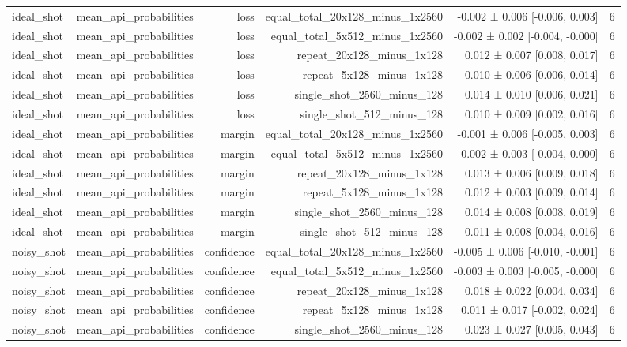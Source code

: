 \begin{table}
\begin{tabular}{lrrrrr}
ideal\_shot & mean\_api\_probabilities & loss & equal\_total\_20x128\_minus\_1x2560 & -0.002 ± 0.006 [-0.006, 0.003] & 6 \\
ideal\_shot & mean\_api\_probabilities & loss & equal\_total\_5x512\_minus\_1x2560 & -0.002 ± 0.002 [-0.004, -0.000] & 6 \\
ideal\_shot & mean\_api\_probabilities & loss & repeat\_20x128\_minus\_1x128 & 0.012 ± 0.007 [0.008, 0.017] & 6 \\
ideal\_shot & mean\_api\_probabilities & loss & repeat\_5x128\_minus\_1x128 & 0.010 ± 0.006 [0.006, 0.014] & 6 \\
ideal\_shot & mean\_api\_probabilities & loss & single\_shot\_2560\_minus\_128 & 0.014 ± 0.010 [0.006, 0.021] & 6 \\
ideal\_shot & mean\_api\_probabilities & loss & single\_shot\_512\_minus\_128 & 0.010 ± 0.009 [0.002, 0.016] & 6 \\
ideal\_shot & mean\_api\_probabilities & margin & equal\_total\_20x128\_minus\_1x2560 & -0.001 ± 0.006 [-0.005, 0.003] & 6 \\
ideal\_shot & mean\_api\_probabilities & margin & equal\_total\_5x512\_minus\_1x2560 & -0.002 ± 0.003 [-0.004, 0.000] & 6 \\
ideal\_shot & mean\_api\_probabilities & margin & repeat\_20x128\_minus\_1x128 & 0.013 ± 0.006 [0.009, 0.018] & 6 \\
ideal\_shot & mean\_api\_probabilities & margin & repeat\_5x128\_minus\_1x128 & 0.012 ± 0.003 [0.009, 0.014] & 6 \\
ideal\_shot & mean\_api\_probabilities & margin & single\_shot\_2560\_minus\_128 & 0.014 ± 0.008 [0.008, 0.019] & 6 \\
ideal\_shot & mean\_api\_probabilities & margin & single\_shot\_512\_minus\_128 & 0.011 ± 0.008 [0.004, 0.016] & 6 \\
noisy\_shot & mean\_api\_probabilities & confidence & equal\_total\_20x128\_minus\_1x2560 & -0.005 ± 0.006 [-0.010, -0.001] & 6 \\
noisy\_shot & mean\_api\_probabilities & confidence & equal\_total\_5x512\_minus\_1x2560 & -0.003 ± 0.003 [-0.005, -0.000] & 6 \\
noisy\_shot & mean\_api\_probabilities & confidence & repeat\_20x128\_minus\_1x128 & 0.018 ± 0.022 [0.004, 0.034] & 6 \\
noisy\_shot & mean\_api\_probabilities & confidence & repeat\_5x128\_minus\_1x128 & 0.011 ± 0.017 [-0.002, 0.024] & 6 \\
noisy\_shot & mean\_api\_probabilities & confidence & single\_shot\_2560\_minus\_128 & 0.023 ± 0.027 [0.005, 0.043] & 6 \\

\end{tabular}
\end{table}
